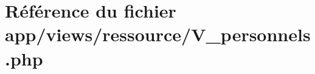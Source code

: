 \hypertarget{_v__personnels_8php}{}\section{Référence du fichier app/views/ressource/\+V\+\_\+personnels.php}
\label{_v__personnels_8php}
